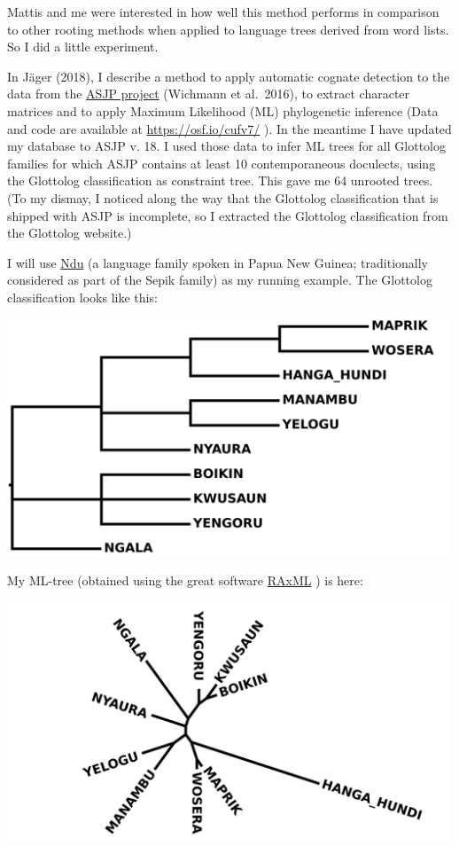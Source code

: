\documentclass[
  a4paper,
  14pt,
  oneside,
  tablecaptionabove
]{scrbook}
\begin{document}
{Mattis and me were interested in how well this method performs in
comparison to other rooting methods when applied to language trees
derived from word lists. So I did a little experiment.}

{In Jäger (2018), I describe a method to apply automatic cognate
detection to the data from the \href{https://asjp.clld.org/}{ASJP
project} (Wichmann et al.~2016), to extract character matrices and to
apply Maximum Likelihood (ML) phylogenetic inference (Data and code are
available at \url{https://osf.io/cufv7/} ). In the meantime I have
updated my database to ASJP v. 18. I used those data to infer ML trees
for all Glottolog families for which ASJP contains at least 10
contemporaneous doculects, using the Glottolog classification as
constraint tree. This gave me 64 unrooted trees. (To my dismay, I
noticed along the way that the Glottolog classification that is shipped
with ASJP is incomplete, so I extracted the Glottolog classification
from the Glottolog website.)}

{I will use
\href{https://glottolog.org/resource/languoid/id/nduu1242}{Ndu} (a
language family spoken in Papua New Guinea; traditionally considered as
part of the Sepik family) as my running example. The Glottolog
classification looks like this:}

{\includegraphics[width=5.21875in,height=2.78125in]{images/Ndu.glot_.jpg}}

{My ML-tree (obtained using the great software
\href{https://cme.h-its.org/exelixis/web/software/raxml/index.html}{RAxML}
) is here:}

{\includegraphics[width=5.21875in,height=2.78125in]{images/Ndu.unrooted.jpg}}
\end{document}
